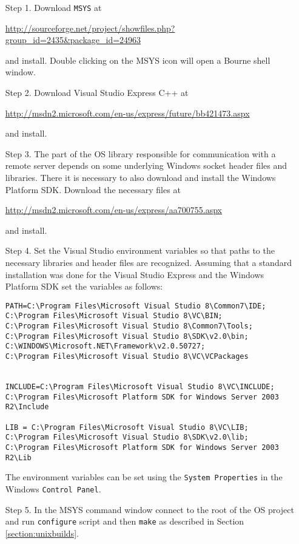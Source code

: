 \documentclass[11pt]{article}
\renewcommand{\_}{{\char"5F}}
\renewcommand{\{}{{\char"7B}}
\renewcommand{\}}{{\char"7D}}
\renewcommand{\^}{{\char"0D}}
\renewcommand{\'}{{\char"0D}}
\begin{document}
\begin{itemize}

\item[Step 1.] Download {\tt MSYS} at

\begin{center}
\url{http://sourceforge.net/project/showfiles.php?group_id=2435&package_id=24963}
\end{center}

and install.  Double clicking on the MSYS icon will open a Bourne shell window. 

\item[Step 2.]  Download  Visual Studio Express C++ at

 \url{http://msdn2.microsoft.com/en-us/express/future/bb421473.aspx}
 
and install. 
 
 \item[Step 3.]  The part of the OS library responsible for communication with a remote server depends on some underlying Windows socket header files and libraries. There it is necessary to also download and install the Windows Platform SDK. Download the necessary files at
 
 \url{http://msdn2.microsoft.com/en-us/express/aa700755.aspx}
 
 and install. 

\item[Step 4.]   Set the Visual Studio environment variables so that paths to the necessary libraries and header files  are recognized.  Assuming that a standard installation was done for the Visual Studio Express and the Windows Platform SDK set the variables as follows:

\begin{verbatim}
PATH=C:\Program Files\Microsoft Visual Studio 8\Common7\IDE;
C:\Program Files\Microsoft Visual Studio 8\VC\BIN;
C:\Program Files\Microsoft Visual Studio 8\Common7\Tools;
C:\Program Files\Microsoft Visual Studio 8\SDK\v2.0\bin;
C:\WINDOWS\Microsoft.NET\Framework\v2.0.50727;
C:\Program Files\Microsoft Visual Studio 8\VC\VCPackages


INCLUDE=C:\Program Files\Microsoft Visual Studio 8\VC\INCLUDE;
C:\Program Files\Microsoft Platform SDK for Windows Server 2003 R2\Include

LIB = C:\Program Files\Microsoft Visual Studio 8\VC\LIB;
C:\Program Files\Microsoft Visual Studio 8\SDK\v2.0\lib;
C:\Program Files\Microsoft Platform SDK for Windows Server 2003 R2\Lib
\end{verbatim}

The environment variables can be set using the {\tt System Properties} in the Windows {\tt Control Panel}.


\item[Step 5.]  In the MSYS command window connect to the root of the OS project and run  {\tt configure}  script  and then {\tt make} as described in Section \ref{section:unixbuilds}.

\end{itemize}
\end{document}
